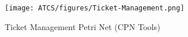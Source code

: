 \documentclass[../Relazione.tex]{subfiles}
\begin{document}
\begin{landscape}
    \begin{figure}[!htbp]
        \centering
        \texttt{[image: ATCS/figures/Ticket-Management.png]}
        \caption{Ticket Management Petri Net (CPN Tools)}
        \label{fig:CPN_net}
    \end{figure}
\end{landscape}
    
\end{document}
